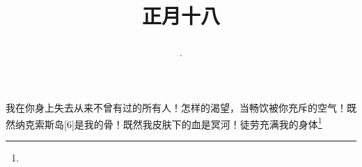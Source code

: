 \title{\date[d=27,m=2,y=2024][year:cn-y,年,month:cn,day:cn,日,·,weekday]·正月十八 }
我在你身上失去从来不曾有过的所有人！怎样的渴望，当畅饮被你充斥的空气！既然纳克索斯岛[6]是我的骨！既然我皮肤下的血是冥河！徒劳充满我的身体\footnote{ }

